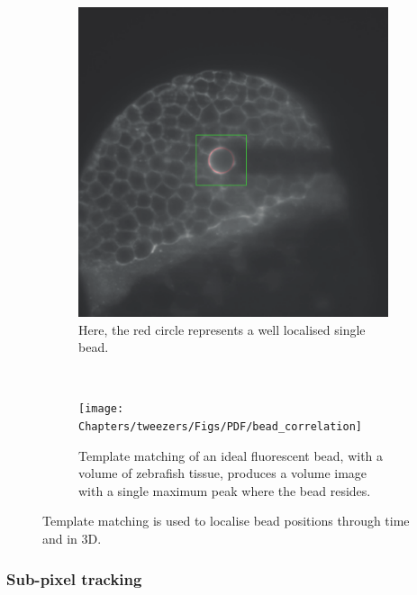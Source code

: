 \begin{figure}[t!]
 \centering
 \begin{subfigure}[t]{0.4\textwidth}
  \centering
  \includegraphics[width=\linewidth]{Chapters/tweezers/Figs/PDF/bead_tracked}
  \caption{Here, the red circle represents a well localised single bead.}\label{fig:bead_tracked}
 \end{subfigure}\\
  \vspace{\abovecaptionskip}
 \begin{subfigure}[t]{\textwidth}
  \centering
  \texttt{[image: Chapters/tweezers/Figs/PDF/bead\_correlation]}
  \caption{
  Template matching of an ideal fluorescent bead, with a volume of \gls{zebrafish} tissue, produces a volume image with a single maximum peak where the bead resides.
  } \label{fig:bead_correlation}
 \end{subfigure}%
 \caption{Template matching is used to localise bead positions through time and in 3D.
 }
\end{figure}

\subsubsection{Sub-pixel tracking}

